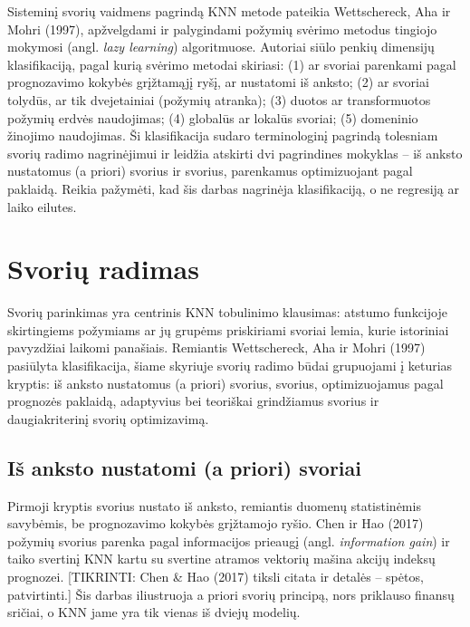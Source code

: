 \documentclass[]{VUMIFTemplateClass}
\begin{document}
    Sisteminį svorių vaidmens pagrindą KNN metode pateikia Wettschereck, Aha ir Mohri (1997), apžvelgdami ir palygindami požymių svėrimo metodus tingiojo mokymosi (angl. \textit{lazy learning}) algoritmuose. Autoriai siūlo penkių dimensijų klasifikaciją, pagal kurią svėrimo metodai skiriasi: (1) ar svoriai parenkami pagal prognozavimo kokybės grįžtamąjį ryšį, ar nustatomi iš anksto; (2) ar svoriai tolydūs, ar tik dvejetainiai (požymių atranka); (3) duotos ar transformuotos požymių erdvės naudojimas; (4) globalūs ar lokalūs svoriai; (5) domeninio žinojimo naudojimas. Ši klasifikacija sudaro terminologinį pagrindą tolesniam svorių radimo nagrinėjimui ir leidžia atskirti dvi pagrindines mokyklas -- iš anksto nustatomus (a priori) svorius ir svorius, parenkamus optimizuojant pagal paklaidą. Reikia pažymėti, kad šis darbas nagrinėja klasifikaciją, o ne regresiją ar laiko eilutes. %


    \section{Svorių radimas}

    Svorių parinkimas yra centrinis KNN tobulinimo klausimas: atstumo funkcijoje skirtingiems požymiams ar jų grupėms priskiriami svoriai lemia, kurie istoriniai pavyzdžiai laikomi panašiais. Remiantis Wettschereck, Aha ir Mohri (1997) pasiūlyta klasifikacija, šiame skyriuje svorių radimo būdai grupuojami į keturias kryptis: iš anksto nustatomus (a priori) svorius, svorius, optimizuojamus pagal prognozės paklaidą, adaptyvius bei teoriškai grindžiamus svorius ir daugiakriterinį svorių optimizavimą.

    \subsection{Iš anksto nustatomi (a priori) svoriai}

    Pirmoji kryptis svorius nustato iš anksto, remiantis duomenų statistinėmis savybėmis, be prognozavimo kokybės grįžtamojo ryšio. Chen ir Hao (2017) požymių svorius parenka pagal informacijos prieaugį (angl. \textit{information gain}) ir taiko svertinį KNN kartu su svertine atramos vektorių mašina akcijų indeksų prognozei. [TIKRINTI: Chen \& Hao (2017) tiksli citata ir detalės -- spėtos, patvirtinti.] Šis darbas iliustruoja a priori svorių principą, nors priklauso finansų sričiai, o KNN jame yra tik vienas iš dviejų modelių.
\end{document}
